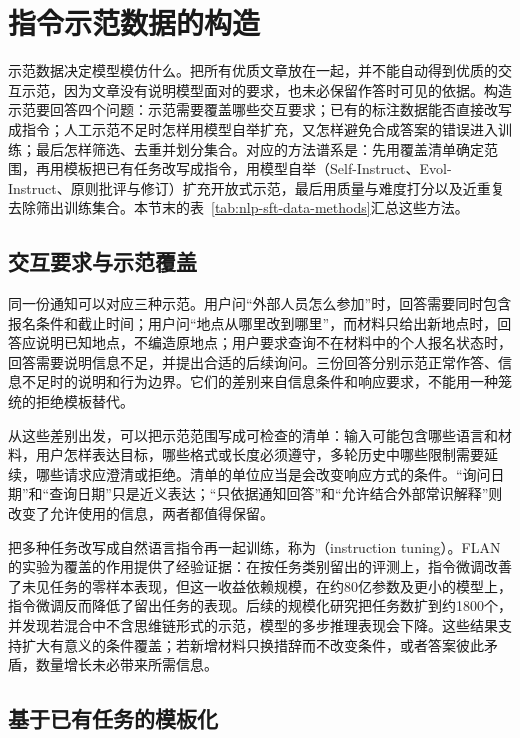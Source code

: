 \section{指令示范数据的构造}
\label{sec:nlp-sft-demonstrations}

示范数据决定模型模仿什么。把所有优质文章放在一起，并不能自动得到优质的交互示范，因为文章没有说明模型面对的要求，也未必保留作答时可见的依据。构造示范要回答四个问题：示范需要覆盖哪些交互要求；已有的标注数据能否直接改写成指令；人工示范不足时怎样用模型自举扩充，又怎样避免合成答案的错误进入训练；最后怎样筛选、去重并划分集合。对应的方法谱系是：先用覆盖清单确定范围，再用模板把已有任务改写成指令，用模型自举（Self-Instruct、Evol-Instruct、原则批评与修订）扩充开放式示范，最后用质量与难度打分以及近重复去除筛出训练集合。本节末的表~\ref{tab:nlp-sft-data-methods}汇总这些方法。

\subsection{交互要求与示范覆盖}
\label{sec:nlp-sft-coverage}

同一份通知可以对应三种示范。用户问“外部人员怎么参加”时，回答需要同时包含报名条件和截止时间；用户问“地点从哪里改到哪里”，而材料只给出新地点时，回答应说明已知地点，不编造原地点；用户要求查询不在材料中的个人报名状态时，回答需要说明信息不足，并提出合适的后续询问。三份回答分别示范正常作答、信息不足时的说明和行为边界。它们的差别来自信息条件和响应要求，不能用一种笼统的拒绝模板替代。

从这些差别出发，可以把示范范围写成可检查的清单：输入可能包含哪些语言和材料，用户怎样表达目标，哪些格式或长度必须遵守，多轮历史中哪些限制需要延续，哪些请求应澄清或拒绝。清单的单位应当是会改变响应方式的条件。“询问日期”和“查询日期”只是近义表达；“只依据通知回答”和“允许结合外部常识解释”则改变了允许使用的信息，两者都值得保留。

把多种任务改写成自然语言指令再一起训练，称为（instruction tuning）。FLAN的实验为覆盖的作用提供了经验证据：在按任务类别留出的评测上，指令微调改善了未见任务的零样本表现，但这一收益依赖规模，在约80亿参数及更小的模型上，指令微调反而降低了留出任务的表现。后续的规模化研究把任务数扩到约1800个，并发现若混合中不含思维链形式的示范，模型的多步推理表现会下降。这些结果支持扩大有意义的条件覆盖；若新增材料只换措辞而不改变条件，或者答案彼此矛盾，数量增长未必带来所需信息。

\subsection{基于已有任务的模板化}
\label{sec:nlp-sft-templating}

